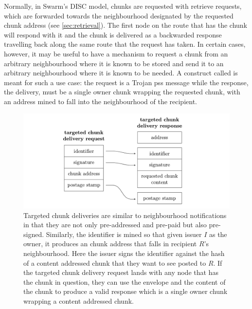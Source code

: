 Normally, in Swarm's DISC model, chunks are requested with retrieve requests, which are forwarded towards the neighbourhood designated by the requested chunk address (see \ref{sec:retrieval}). The first node on the route that has the chunk will respond with it and the chunk is delivered as a backwarded response travelling back along the same route that the request has taken. In certain cases, however, it may be useful to have a mechanism to request a chunk from an arbitrary neighbourhood where it is known to be stored and send it to an arbitrary neighbourhood where it is known to be needed. A construct called  is meant for such a use case: the request is a Trojan pss message while the response, the delivery, must be a single owner chunk wrapping the requested chunk, with an address mined to fall into the neighbourhood of the recipient.  


\begin{figure}[htbp]
\centering
\includegraphics[width=\textwidth]{fig/targeted-chunk-delivery.pdf}      
\caption[Targeted chunk deliveries \statusgreen]{Targeted chunk deliveries are similar to neighbourhood notifications in that they are not only pre-addressed and pre-paid but also pre-signed. Similarly, the identifier is mined so that given issuer $I$ as the owner, it produces an chunk address that falls in recipient $R$'s neighbourhood. Here the issuer signs the identifier against the hash of a content addressed chunk that they want to see posted to $R$. If the targeted chunk delivery request lands with any node that has the chunk in question, they can use the envelope and the content of the chunk to produce a valid response which is a single owner chunk wrapping a content addressed chunk.}
\label{fig:targeted-chunk-delivery}
\end{figure}

